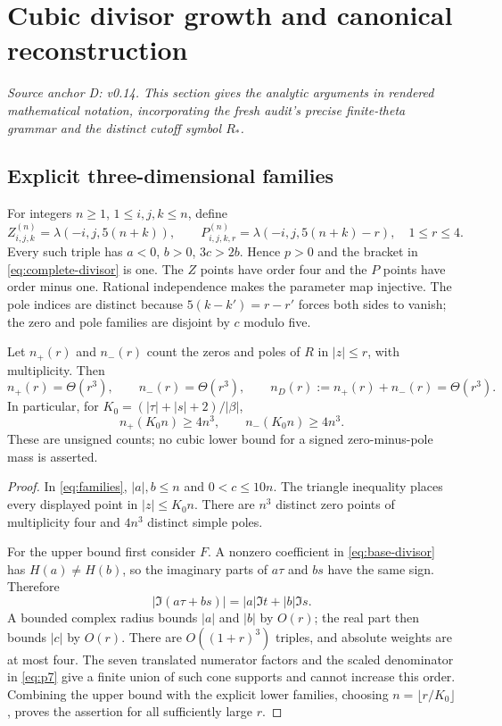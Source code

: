 \section{Cubic divisor growth and canonical reconstruction}\label{sec:reconstruction}
\noindent\textit{Source anchor D: v0.14. This section gives the analytic arguments in rendered mathematical notation, incorporating the fresh audit's precise finite-theta grammar and the distinct cutoff symbol $R_*$.}

\subsection{Explicit three-dimensional families}
For integers $n\ge1$, $1\le i,j,k\le n$, define
\begin{equation}\label{eq:families}
 Z_{i,j,k}^{(n)}=\lambda(-i,j,5(n+k)),\qquad
 P_{i,j,k,r}^{(n)}=\lambda(-i,j,5(n+k)-r),\quad 1\le r\le4.
\end{equation}
Every such triple has $a<0$, $b>0$, $3c>2b$. Hence $p>0$ and the bracket in \eqref{eq:complete-divisor} is one. The $Z$ points have order four and the $P$ points have order minus one. Rational independence makes the parameter map injective. The pole indices are distinct because $5(k-k')=r-r'$ forces both sides to vanish; the zero and pole families are disjoint by $c$ modulo five.
\begin{theorem}\label{thm:cubic-growth}
Let $n_+(r)$ and $n_-(r)$ count the zeros and poles of $R$ in $|z|\le r$, with multiplicity. Then
\[
 n_+(r)=\Theta(r^3),\qquad n_-(r)=\Theta(r^3),\qquad
 n_D(r):=n_+(r)+n_-(r)=\Theta(r^3).
\]
In particular, for $K_0=(|\tau|+|s|+2)/|\beta|$,
\[
 n_+(K_0n)\ge4n^3,\qquad n_-(K_0n)\ge4n^3.
\]
These are unsigned counts; no cubic lower bound for a signed zero-minus-pole mass is asserted.
\end{theorem}
\begin{proof}
In \eqref{eq:families}, $|a|,b\le n$ and $0<c\le10n$. The triangle inequality places every displayed point in $|z|\le K_0n$. There are $n^3$ distinct zero points of multiplicity four and $4n^3$ distinct simple poles.

For the upper bound first consider $F$. A nonzero coefficient in \eqref{eq:base-divisor} has $H(a)\ne H(b)$, so the imaginary parts of $a\tau$ and $bs$ have the same sign. Therefore
\[
 |\Im(a\tau+bs)|=|a|\Im t+|b|\Im s.
\]
A bounded complex radius bounds $|a|$ and $|b|$ by $O(r)$; the real part then bounds $|c|$ by $O(r)$. There are $O((1+r)^3)$ triples, and absolute weights are at most four. The seven translated numerator factors and the scaled denominator in \eqref{eq:p7} give a finite union of such cone supports and cannot increase this order. Combining the upper bound with the explicit lower families, choosing $n=\lfloor r/K_0\rfloor$, proves the assertion for all sufficiently large $r$.
\end{proof}

